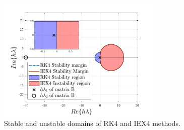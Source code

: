 \documentclass[11pt,a4paper,oneside]{article}
\begin{document}
\begin{figure}[h]
    \centering
        \includegraphics[width = 0.7\textwidth]{gfx/ex6_1.pdf}
        \caption{Stable and unstable domains of RK4 and IEX4 methods.}\label{fig:ex6}
\end{figure}
\end{document}

